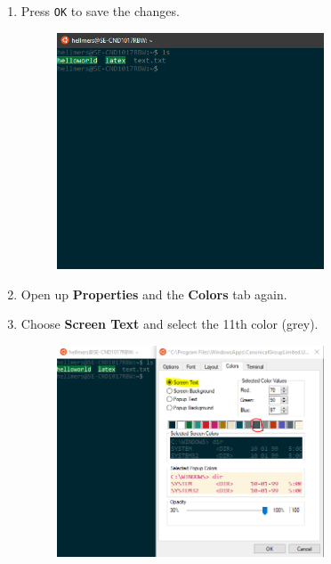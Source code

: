 \begin{enumerate}[a)]
\begin{enumerate}[1.]
        \item Press \texttt{OK} to save the changes.
        \begin{figure}[H]
            \centering
            \includegraphics[width=0.75\textwidth]{tex/WSL/Ubuntu_terminal_colors/Figures/10.PNG}
        \end{figure}
        
        \item Open up \textbf{Properties} and the \textbf{Colors} tab again.
        
        \item Choose \textbf{Screen Text} and select the 11th color (grey).
        \begin{figure}[H]
            \centering
            \includegraphics[width=0.75\textwidth]{tex/WSL/Ubuntu_terminal_colors/Figures/11.PNG}
        \end{figure}
        

\end{enumerate}
\end{enumerate}
